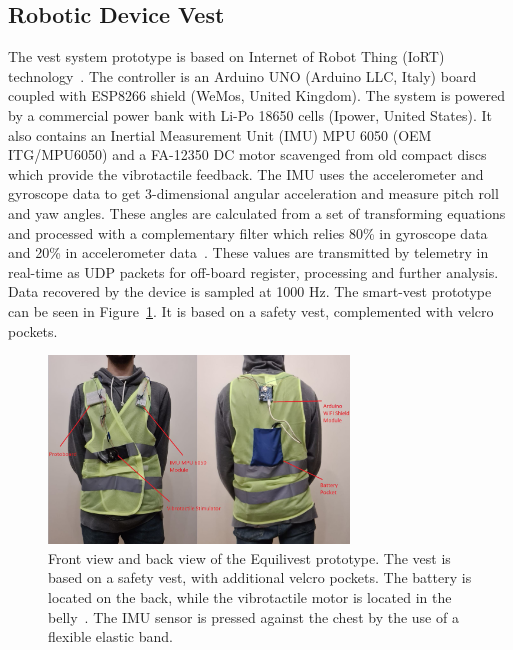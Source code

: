 \documentclass[conference]{IEEEtran}
\begin{document}

%

\subsection{Robotic Device Vest}
\label{sec:vest}

The vest system prototype is based on Internet of Robot Thing (IoRT) technology~\cite{Simoens.etal2018,Domingo.etal2012}. The controller is an Arduino UNO (Arduino LLC, Italy) board coupled with ESP8266 shield (WeMos, United Kingdom).  The system is powered by a commercial power bank with Li-Po 18650 cells (Ipower, United States). It also contains an Inertial Measurement Unit (IMU) MPU 6050 (OEM ITG/MPU6050) and a FA-12350 DC motor scavenged from old compact discs which provide the vibrotactile feedback.  The IMU uses the accelerometer and gyroscope data to get 3-dimensional angular acceleration and measure pitch roll and yaw angles. These angles are calculated from a set of transforming equations and processed with a complementary filter which relies 80\% in gyroscope data and 20\% in accelerometer data~\cite{Fetick.2022}. These values are transmitted by telemetry in real-time as UDP packets for off-board register, processing and further analysis. Data recovered by the device is sampled at 1000 Hz. The smart-vest prototype can be seen in Figure~\ref{fig:smart-vest}.  It is based on a safety vest, complemented with velcro pockets. 

\begin{figure}[h!]
\centering
\includegraphics[width=8cm]{equilivest.jpg}
\caption{Front view and back view of the Equilivest prototype.  The vest is based on a safety vest, with additional velcro pockets.  The battery is located on the back, while the vibrotactile motor is located in the belly~\cite{Brandebusemeyer.etal2021}.  The IMU sensor is pressed against the chest by the use of a flexible elastic band. }
\label{fig:smart-vest}
\end{figure}
\end{document}
